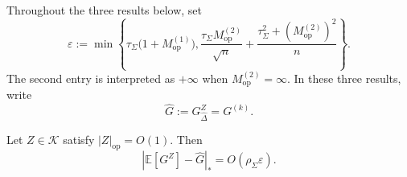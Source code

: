 \documentclass[EJP, preprint, NODS, nobera, nofontexpansion]{ejpecp}
\DeclareMathOperator{\op}{op}
\begin{document}
Throughout the three results below, set
\begin{equation}
\label{eq:classwise_comparison_error}
    \varepsilon
    :=\min\left\{
        \tau_\Sigma\bigl(1+M_{\op}^{(1)}\bigr),
        \frac{\tau_\Sigma M_{\op}^{(2)}}{\sqrt n}
        +\frac{\tau_\Sigma^2+(M_{\op}^{(2)})^2}{n}
    \right\}.
\end{equation}
The second entry is interpreted as $+\infty$ when
$M_{\op}^{(2)}=\infty$. In these three results, write
\[
    \widehat G:=G_{\widehat\Delta}^Z=G^{(k)}.
\]

\begin{proposition}
\label{pro:classwise_averaged_pivot_comparison}
Let $Z\in\mathcal K$ satisfy $|Z|_{\op}=O(1)$. Then
\begin{equation}
    |\mathbb E[G^Z]-\widehat G|_*
    =O\!\left(\rho_\Sigma\varepsilon\right).
\end{equation}
\end{proposition}
\end{document}
